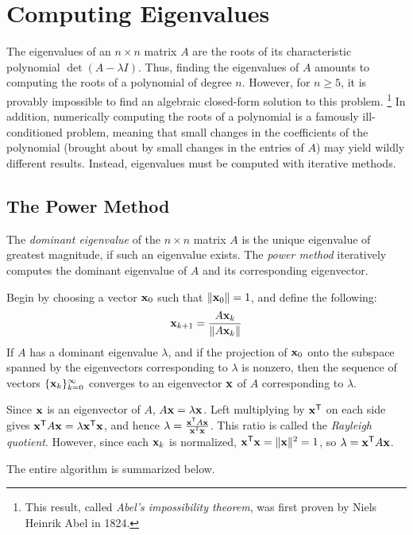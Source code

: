 \section*{Computing Eigenvalues} %

The eigenvalues of an $n \times n$ matrix $A$ are the roots of its characteristic polynomial $\det(A - \lambda I)$.
Thus, finding the eigenvalues of $A$ amounts to computing the roots of a polynomial of degree $n$.
However, for $n \ge 5$, it is provably impossible to find an algebraic closed-form solution to this problem.%
\footnote{This result, called \emph{Abel's impossibility theorem}, was first proven by Niels Heinrik Abel in 1824.}
In addition, numerically computing the roots of a polynomial is a famously ill-conditioned problem, meaning that small changes in the coefficients of the polynomial (brought about by small changes in the entries of $A$) may yield wildly different results.
Instead, eigenvalues must be computed with iterative methods.

\subsection*{The Power Method} %

The \emph{dominant eigenvalue} of the $n \times n$ matrix $A$ is the unique eigenvalue of greatest magnitude, if such an eigenvalue exists.
The \emph{power method} iteratively computes the dominant eigenvalue of $A$ and its corresponding eigenvector.

Begin by choosing a vector $\mathbf{x}_0$ such that $\|\mathbf{x}_0\|=1$, and define the following:
\[\mathbf{x}_{k+1}=\frac{A\mathbf{x}_k}{\|A\mathbf{x}_k\|}\]
If $A$ has a dominant eigenvalue $\lambda$, and if the projection of $\mathbf{x}_0$ onto the subspace spanned by the eigenvectors corresponding to $\lambda$ is nonzero, then the sequence of vectors $\{\mathbf{x}_k\}_{k=0}^\infty$ converges to an eigenvector $\mathbf{x}$ of $A$ corresponding to $\lambda$.

Since $\mathbf{x}$ is an eigenvector of $A$, $A\mathbf{x} = \lambda \mathbf{x}$.
Left multiplying by $\mathbf{x}^{\mathsf T}$ on each side gives $\mathbf{x}^{\mathsf T} A\mathbf{x} = \lambda \mathbf{x}^{\mathsf T}\mathbf{x}$, and hence $\lambda = \frac{\mathbf{x}^{\mathsf T} A\mathbf{x}}{\mathbf{x}^{\mathsf T}\mathbf{x}}$.
This ratio is called the \emph{Rayleigh quotient}.
However, since each $\mathbf{x}_k$ is normalized, $\mathbf{x}^{\mathsf T}\mathbf{x} = \|\mathbf{x}\|^2 = 1$, so $\lambda = \mathbf{x}^{\mathsf T} A\mathbf{x}$.

The entire algorithm is summarized below.

